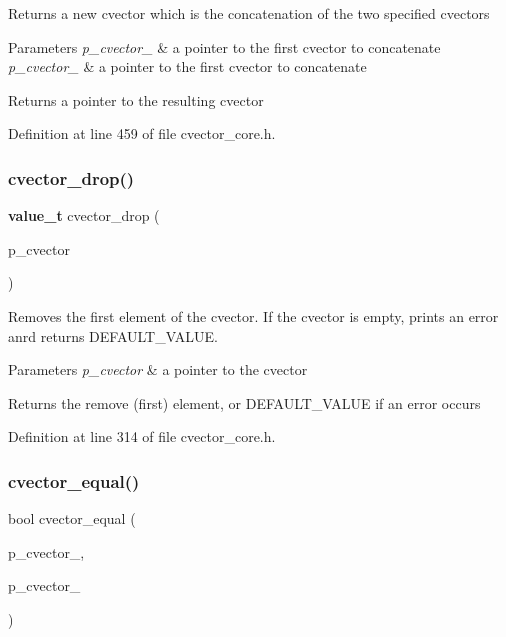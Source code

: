 Returns a new cvector which is the concatenation of the two specified cvectors 
\begin{DoxyParams}{Parameters}
{\em p\+\_\+cvector\+\_} & a pointer to the first cvector to concatenate \\
\hline
{\em p\+\_\+cvector\+\_} & a pointer to the first cvector to concatenate \\
\hline
\end{DoxyParams}
\begin{DoxyReturn}{Returns}
a pointer to the resulting cvector 
\end{DoxyReturn}


Definition at line 459 of file cvector\+\_\+core.\+h.

\mbox{\label{cvector__core_8h_aa1f74a774799a6190e0f63e46fd034ad}} 
\subsubsection{cvector\+\_\+drop()}
{\footnotesize\ttfamily \textbf{ value\+\_\+t} cvector\+\_\+drop (\begin{DoxyParamCaption}\item[{\textbf{ cvector} $\ast$}]{p\+\_\+cvector }\end{DoxyParamCaption})}

Removes the first element of the cvector. If the cvector is empty, prints an error anrd returns D\+E\+F\+A\+U\+L\+T\+\_\+\+V\+A\+L\+UE. 
\begin{DoxyParams}{Parameters}
{\em p\+\_\+cvector} & a pointer to the cvector \\
\hline
\end{DoxyParams}
\begin{DoxyReturn}{Returns}
the remove (first) element, or D\+E\+F\+A\+U\+L\+T\+\_\+\+V\+A\+L\+UE if an error occurs 
\end{DoxyReturn}


Definition at line 314 of file cvector\+\_\+core.\+h.

\mbox{\label{cvector__core_8h_aa0027f2467c3f04fb382dbec8cb6e33b}} 
\subsubsection{cvector\+\_\+equal()}
{\footnotesize\ttfamily bool cvector\+\_\+equal (\begin{DoxyParamCaption}\item[{\textbf{ cvector} $\ast$}]{p\+\_\+cvector\+\_,  }\item[{\textbf{ cvector} $\ast$}]{p\+\_\+cvector\+\_ }\end{DoxyParamCaption})}

